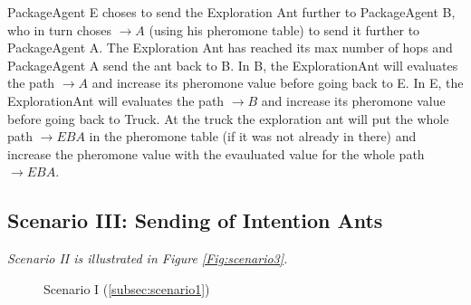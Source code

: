 \npar PackageAgent E choses to send the Exploration Ant further to PackageAgent B, who in turn choses \textit{$\rightarrow A$} (using his pheromone table) to send it further to PackageAgent A. The Exploration Ant has reached its max number of hops and PackageAgent A send the ant back to B. In B, the ExplorationAnt will evaluates the path \textit{$\rightarrow A$} and increase its pheromone value before going back to E. In E, the ExplorationAnt will evaluates the path \textit{$\rightarrow B$} and increase its pheromone value before going back to Truck. At the truck the exploration ant will put the whole path \textit{$\rightarrow EBA$} in the pheromone table (if it was not already in there) and increase the pheromone value with the evauluated value for the whole path \textit{$\rightarrow EBA$}. 

\subsection*{Scenario III: Sending of Intention Ants}
\label{subsec:scenario3}
\npar \textit{Scenario II is illustrated in Figure \ref{Fig:scenario3}.}

\begin{figure}[!h]
        \vspace{0.5pt}
        \begin{center}
       			\setlength\fboxsep{0.5pt}
				\setlength\fboxrule{0.5pt}
		\end{center}
		\caption{Scenario I (\ref{subsec:scenario1})}
		\label{Fig:scenario1}
        \vspace{0.5pt}
\end{figure}

